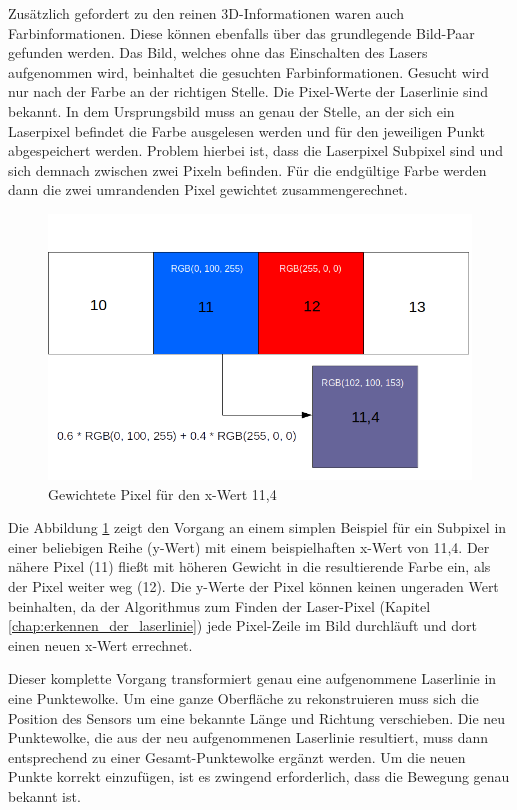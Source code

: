 	Zusätzlich gefordert zu den reinen 3D-Informationen waren auch Farbinformationen. Diese können ebenfalls über das grundlegende Bild-Paar gefunden werden. Das Bild, welches ohne das Einschalten des Lasers aufgenommen wird, beinhaltet die gesuchten Farbinformationen. Gesucht wird nur nach der Farbe an der richtigen Stelle. Die Pixel-Werte der Laserlinie sind bekannt. In dem Ursprungsbild muss an genau der Stelle, an der sich ein Laserpixel befindet die Farbe ausgelesen werden und für den jeweiligen Punkt abgespeichert werden. Problem hierbei ist, dass die Laserpixel Subpixel sind und sich demnach zwischen zwei Pixeln befinden. Für die endgültige Farbe werden dann die zwei umrandenden Pixel gewichtet zusammengerechnet.
	\begin{figure}[h]
		\centering
		\includegraphics[width=0.85\linewidth]{img/hauptteil/bildverarbeitung/weighted_pixel.png}
		\caption{Gewichtete Pixel für den x-Wert 11,4}
		\label{fig:weighted_pixel}
	\end{figure}

	Die Abbildung \ref{fig:weighted_pixel} zeigt den Vorgang an einem simplen Beispiel für ein Subpixel in einer beliebigen Reihe (y-Wert) mit einem beispielhaften x-Wert von 11,4. Der nähere Pixel (11) fließt mit höheren Gewicht in die resultierende Farbe ein, als der Pixel weiter weg (12). Die y-Werte der Pixel können keinen ungeraden Wert beinhalten, da der Algorithmus zum Finden der Laser-Pixel (Kapitel \ref{chap:erkennen_der_laserlinie}) jede Pixel-Zeile im Bild durchläuft und dort einen neuen x-Wert errechnet.
	
	Dieser komplette Vorgang transformiert genau eine aufgenommene Laserlinie in eine Punktewolke. Um eine ganze Oberfläche zu rekonstruieren muss sich die Position des Sensors um eine bekannte Länge und Richtung verschieben. Die neu Punktewolke, die aus der neu aufgenommenen Laserlinie resultiert, muss dann entsprechend zu einer Gesamt-Punktewolke ergänzt werden. Um die neuen Punkte korrekt einzufügen, ist es zwingend erforderlich, dass die Bewegung genau bekannt ist. 
	
